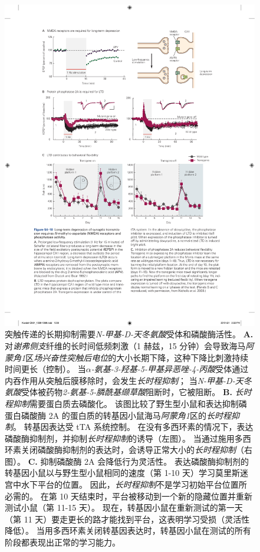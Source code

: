 \begin{figure}[htbp]
	\centering
	\includegraphics[width=1.0\linewidth]{chap54/fig_54_10}
	\caption{突触传递的长期抑制需要\textit{N-甲基-D-天冬氨酸}受体和磷酸酶活性。
		\textbf{A.} 对\textit{谢弗侧支}纤维的长时间低频刺激（1 赫兹，15 分钟）会导致海马\textit{阿蒙角1}区\textit{场兴奋性突触后电位}的大小长期下降，这种下降比刺激持续时间更长（控制）。
		当\textit{$\alpha$-氨基-3-羟基-5-甲基异恶唑-4-丙酸}受体通过内吞作用从突触后膜移除时，会发生\textit{长时程抑制}；
		当\textit{N-甲基-D-天冬氨酸}受体被药物\textit{2-氨基-5-膦酰基缬草酸}阻断时，它被阻断\cite{dudek1992homosynaptic}。
		\textbf{B.} \textit{长时程抑制}需要蛋白质去磷酸化。
		该图比较了野生型小鼠和表达抑制磷蛋白磷酸酶 2A 的蛋白质的转基因小鼠海马\textit{阿蒙角1}区的\textit{长时程抑制}。
		转基因表达受 tTA 系统控制。
		在没有多西环素的情况下，表达磷酸酶抑制剂，并抑制\textit{长时程抑制}的诱导（左图）。
		当通过施用多西环素关闭磷酸酶抑制剂的表达时，会诱导正常大小的\textit{长时程抑制}（右图）。
		\textbf{C.} 抑制磷酸酶 2A 会降低行为灵活性。
		表达磷酸酶抑制剂的转基因小鼠以与野生型小鼠相同的速度（第 1-10 天）学习莫里斯迷宫中水下平台的位置。
		因此，\textit{长时程抑制}不是学习初始平台位置所必需的。
		在第 10 天结束时，平台被移动到一个新的隐藏位置并重新测试小鼠（第 11-15 天）。
		现在，转基因小鼠在重新测试的第一天（第 11 天）要走更长的路才能找到平台，这表明学习受损（灵活性降低）。
		当用多西环素关闭转基因表达时，转基因小鼠在测试的所有阶段都表现出正常的学习能力\cite{nicholls2008transgenic}。}
	\label{fig:54_10}
\end{figure}


